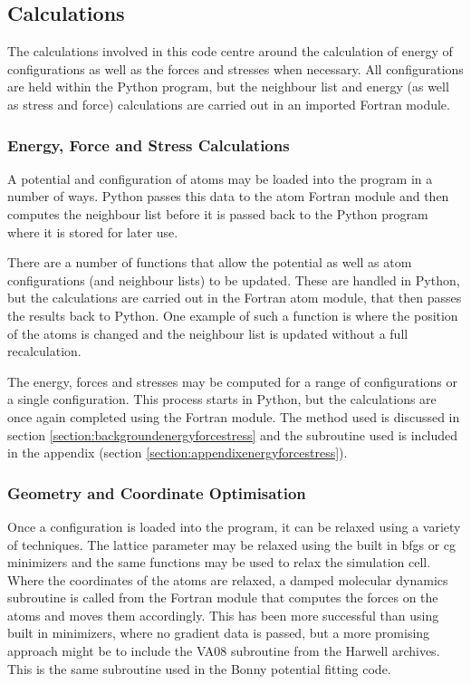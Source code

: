 


\subsection{Calculations}

The calculations involved in this code centre around the calculation of energy of configurations as well as the forces and stresses when necessary.  All configurations are held within the Python program, but the neighbour list and energy (as well as stress and force) calculations are carried out in an imported Fortran module.

\subsubsection{Energy, Force and Stress Calculations}

A potential and configuration of atoms may be loaded into the program in a number of ways.  Python passes this data to the atom Fortran module and then computes the neighbour list before it is passed back to the Python program where it is stored for later use.

There are a number of functions that allow the potential as well as atom configurations (and neighbour lists) to be updated.  These are handled in Python, but the calculations are carried out in the Fortran atom module, that then passes the results back to Python.  One example of such a function is where the position of the atoms is changed and the neighbour list is updated without a full recalculation.

The energy, forces and stresses may be computed for a range of configurations or a single configuration.  This process starts in Python, but the calculations are once again completed using the Fortran module.  The method used is discussed in section \ref{section:backgroundenergyforcestress} and the subroutine used is included in the appendix (section \ref{section:appendixenergyforcestress}).


\subsubsection{Geometry and Coordinate Optimisation}

Once a configuration is loaded into the program, it can be relaxed using a variety of techniques.  The lattice parameter may be relaxed using the built in \acrshort{bfgs} or \acrshort{cg} minimizers and the same functions may be used to relax the simulation cell.  Where the coordinates of the atoms are relaxed, a damped molecular dynamics subroutine is called from the Fortran module that computes the forces on the atoms and moves them accordingly.  This has been more successful than using built in minimizers, where no gradient data is passed, but a more promising approach might be to include the VA08 subroutine from the Harwell archives\cite{harwellva08}.  This is the same subroutine used in the Bonny potential fitting code\cite{bonnyfecr}.



